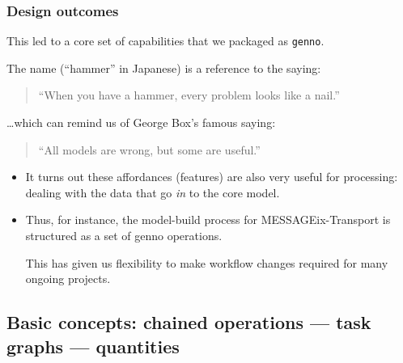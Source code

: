 \documentclass[12pt,aspectratio=169]{beamer}
\renewcommand{\mod}[1]{\texttt{#1}}
\begin{document}
\begin{frame}
\frametitle{Design outcomes}
This led to a core set of capabilities that we packaged as \mod{genno}.

The name (“hammer” in Japanese) is a reference to the saying:

\begin{quote}
  “When you have a hammer, every problem looks like a nail.”
\end{quote}

…which can remind us of George Box's famous saying:
\begin{quote}
  “All models are wrong, but some are useful.”
\end{quote}

\begin{itemize}
  \item It turns out these affordances (features) are also very useful
    for processing: dealing with the data that go \emph{in} to the core model.
  \item Thus, for instance, the model-build process for MESSAGEix-Transport
    is structured as a set of genno operations.

    This has given us flexibility to make workflow changes required for many ongoing projects.
\end{itemize}
\end{frame}

\subsection{Basic concepts: chained operations — task graphs — quantities}
\end{document}
